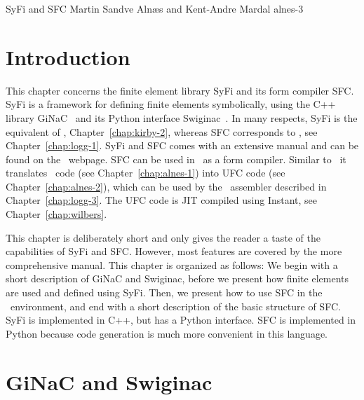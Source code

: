               {SyFi and SFC}
              {Martin Sandve Aln\ae s and Kent-Andre Mardal}
              {alnes-3}

\renewcommand{\AA}{\mathbf{A}}
\newcommand{\LL}{\mathbf{L}}
\newcommand{\JJ}{\mathbf{J}}

\section{Introduction}

This chapter concerns the finite element library SyFi and its form compiler SFC. 
SyFi is a framework for defining finite elements symbolically, using the 
C++ library GiNaC~\citep{BauerFrinkKreckel2000} and its Python interface
Swiginac~\citep{SkavhaugCertik2009}.  
In many respects, SyFi is the equivalent of \fiat,
Chapter~\ref{chap:kirby-2}, whereas SFC corresponds to \ffc,
see Chapter~\ref{chap:logg-1}. SyFi and SFC comes with
an extensive manual \citep{AlnaesMardal2009a} and can be found on the \fenics\ webpage. 
SFC can be used in \fenics\ as a form compiler. Similar to \ffc\ it
translates \ufl\ code (see Chapter~\ref{chap:alnes-1}) 
into UFC code (see Chapter~\ref{chap:alnes-2}), 
which can be used by the \dolfin\ assembler described in
Chapter~\ref{chap:logg-3}. The UFC code is JIT compiled using Instant, see
Chapter~\ref{chap:wilbers}. 

This chapter is deliberately short and only gives the reader a taste of the capabilities of SyFi and SFC. 
However, most features are covered by the more comprehensive manual. 
This chapter is organized as follows: We begin with a short description of GiNaC 
and Swiginac, before we present how finite elements are used and defined using SyFi.   
Then, we present how to use SFC in the \dolfin\ environment, and end with a
short description of the basic structure of SFC. SyFi is implemented in
C++, but has a Python interface. SFC is implemented in Python because 
code generation is much more convenient in this language.     

\section{GiNaC and Swiginac}

